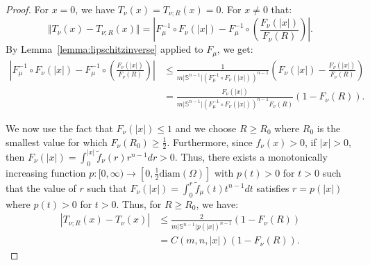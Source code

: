 \documentclass{amsart}
\theoremstyle{lemma}
\theoremstyle{remark}
\begin{document}
\begin{proof}
For $x = 0$, we have $T_{\nu}(x) = T_{\nu; R}(x) = 0$. For $x \neq 0$ that:
\begin{equation}
\Vert T_{\nu}(x) - T_{\nu; R}(x) \Vert = \left\vert F_{\mu}^{-1} \circ F_{\nu}(\vert x \vert) - F_{\mu}^{-1} \circ \left( \frac{F_{\nu}(\vert x \vert )}{F_{\nu}(R)} \right) \right\vert.
\end{equation}
By Lemma~\ref{lemma:lipschitzinverse} applied to $F_{\mu}$, we get:
\begin{align}
\left\vert F_{\mu}^{-1} \circ F_{\nu}(\vert x \vert) - F_{\mu}^{-1} \circ \left( \frac{F_{\nu}( \vert x \vert)}{F_{\nu}(R)} \right) \right\vert &\leq \frac{1}{m \vert \mathbb{S}^{n-1} \vert (F_{\mu}^{-1} \circ F_{\nu}(\vert x \vert))^{n-1}} \left( F_{\nu}(\vert x \vert) - \frac{F_{\nu}(\vert x \vert)}{F_{\nu}(R)} \right)\\
&= \frac{F_{\nu}(\vert x \vert) }{m \vert \mathbb{S}^{n-1} \vert (F_{\mu}^{-1} \circ F_{\nu}(\vert x \vert))^{n-1} F_{\nu}(R)} \left( 1 - F_{\nu}(R) \right).
\end{align}

We now use the fact that $F_{\nu}(\vert x \vert) \leq 1$ and we choose $R\geq R_0$ where $R_0$ is the smallest value for which $F_{\nu}(R_0) \geq \frac{1}{2}$. Furthermore, since $f_{\nu}(x)>0$, if $\vert x \vert>0$, then $F_{\nu}(\vert x \vert) = \int_{0}^{\vert x \vert} \tilde{f}_{\nu}(r) r^{n-1}dr>0$. Thus, there exists a monotonically increasing function $p:[0, \infty) \rightarrow [0, \frac{1}{2} \text{diam}(\Omega)]$ with $p(t)>0$ for $t>0$ such that the value of $r$ such that $F_{\nu}(\vert x \vert) = \int_{0}^{r} \tilde{f}_{\mu}(t) t^{n-1} dt$ satisfies $r= p(\vert x\vert)$ where $p(t)>0$ for $t>0$. Thus, for $R \geq R_0$, we have:
\begin{align}\label{eq:radialmap}
\left\vert T_{\nu;R}(x) - T_{\nu}(x) \right\vert &\leq \frac{2}{m \vert \mathbb{S}^{n-1} \vert p(\vert x \vert)^{n-1}}(1-F_{\nu}(R)) \\
&= C(m, n, \vert x \vert) (1-F_{\nu}(R)).
\end{align}
\end{proof}
\end{document}

